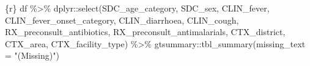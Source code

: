 \documentclass[
  letterpaper,
  DIV=11,
  numbers=noendperiod,
  oneside]{scrreprt}
\newenvironment{Shaded}{\begin{snugshade}}{\end{snugshade}}
\newcommand{\AttributeTok}[1]{\textcolor[rgb]{0.40,0.45,0.13}{#1}}
\newcommand{\FunctionTok}[1]{\textcolor[rgb]{0.28,0.35,0.67}{#1}}
\newcommand{\InformationTok}[1]{\textcolor[rgb]{0.37,0.37,0.37}{#1}}
\newcommand{\NormalTok}[1]{\textcolor[rgb]{0.00,0.23,0.31}{#1}}
\newcommand{\SpecialCharTok}[1]{\textcolor[rgb]{0.37,0.37,0.37}{#1}}
\newcommand{\StringTok}[1]{\textcolor[rgb]{0.13,0.47,0.30}{#1}}
\begin{document}
\begin{Shaded}
\begin{Highlighting}[]
\InformationTok{\textasciigrave{}\textasciigrave{}\textasciigrave{}\{r\}}
\NormalTok{df }\SpecialCharTok{\%\textgreater{}\%}
\NormalTok{  dplyr}\SpecialCharTok{::}\FunctionTok{select}\NormalTok{(SDC\_age\_category,}
\NormalTok{                SDC\_sex,}
\NormalTok{                CLIN\_fever,}
\NormalTok{                CLIN\_fever\_onset\_category,}
\NormalTok{                CLIN\_diarrhoea,}
\NormalTok{                CLIN\_cough,}
\NormalTok{                RX\_preconsult\_antibiotics,}
\NormalTok{                RX\_preconsult\_antimalarials,}
\NormalTok{                CTX\_district,}
\NormalTok{                CTX\_area,}
\NormalTok{                CTX\_facility\_type) }\SpecialCharTok{\%\textgreater{}\%}
\NormalTok{  gtsummary}\SpecialCharTok{::}\FunctionTok{tbl\_summary}\NormalTok{(}\AttributeTok{missing\_text =} \StringTok{"(Missing)"}\NormalTok{)}
\InformationTok{\textasciigrave{}\textasciigrave{}\textasciigrave{}}
\end{Highlighting}
\end{Shaded}
\end{document}
